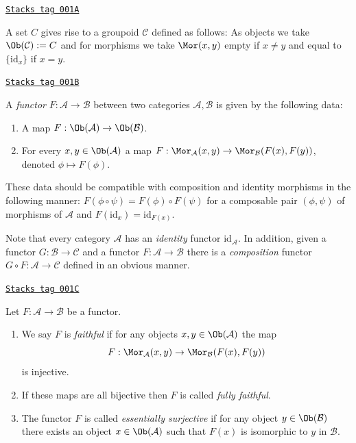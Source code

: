 \begin{example}
\label{categories-example-set-groupoid}
\href{https://stacks.math.columbia.edu/tag/001A}{\texttt{Stacks tag 001A}}

A set $C$ gives rise to a groupoid $\mathcal{C}$ defined as follows:
As objects we take $\Ob(\mathcal{C}) := C$ and for morphisms
we take $\Mor(x, y)$ empty if $x\neq y$ and equal to
$\{\text{id}_x\}$ if $x = y$.
\end{example}

\begin{definition}[Functor]
\label{categories-definition-functor}
\href{https://stacks.math.columbia.edu/tag/001B}{\texttt{Stacks tag 001B}}

A {\it functor} $F : \mathcal{A} \to \mathcal{B}$
between two categories $\mathcal{A}, \mathcal{B}$ is given by the
following data:
\begin{enumerate}
\item A map $F : \Ob(\mathcal{A}) \to \Ob(\mathcal{B})$.
\item For every $x, y \in \Ob(\mathcal{A})$ a map
$F : \Mor_\mathcal{A}(x, y) \to \Mor_\mathcal{B}(F(x), F(y))$,
denoted $\phi \mapsto F(\phi)$.
\end{enumerate}
These data should be compatible with composition and identity morphisms
in the following manner: $F(\phi \circ \psi) =
F(\phi) \circ F(\psi)$ for a composable pair $(\phi, \psi)$ of
morphisms of $\mathcal{A}$ and $F(\text{id}_x) = \text{id}_{F(x)}$.
\end{definition}

Note that every category $\mathcal{A}$ has an
{\it identity} functor $\text{id}_\mathcal{A}$.
In addition, given a functor $G : \mathcal{B} \to \mathcal{C}$
and a functor $F : \mathcal{A} \to \mathcal{B}$ there is
a {\it composition} functor $G \circ F : \mathcal{A} \to \mathcal{C}$
defined in an obvious manner.

\begin{definition}[Faithful]
\label{categories-definition-faithful}
\href{https://stacks.math.columbia.edu/tag/001C}{\texttt{Stacks tag 001C}}

Let $F : \mathcal{A} \to \mathcal{B}$ be a functor.
\begin{enumerate}
\item We say $F$ is {\it faithful} if
for any objects $x, y \in \Ob(\mathcal{A})$ the map
$$
F : \Mor_\mathcal{A}(x, y) \to \Mor_\mathcal{B}(F(x), F(y))
$$
is injective.
\item If these maps are all bijective then $F$ is called
{\it fully faithful}.
\item
The functor $F$ is called {\it essentially surjective} if for any
object $y \in \Ob(\mathcal{B})$ there exists an object
$x \in \Ob(\mathcal{A})$ such that $F(x)$ is isomorphic to $y$ in
$\mathcal{B}$.
\end{enumerate}
\end{definition}


